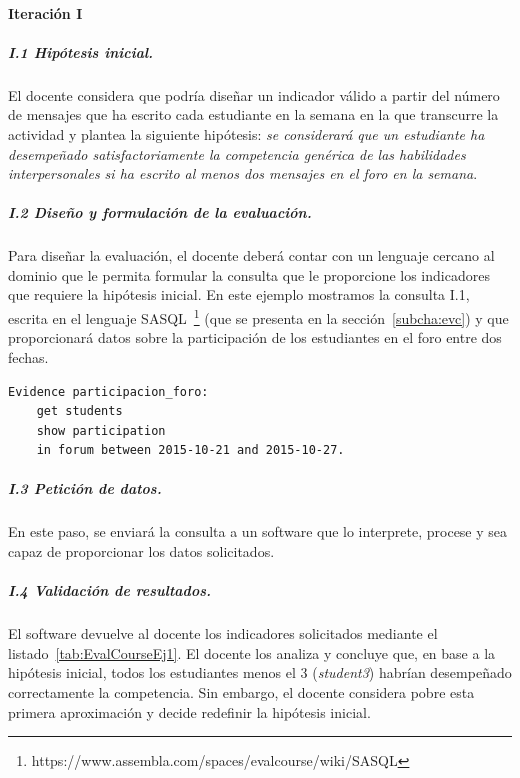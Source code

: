 \paragraph*{Iteración I}

\subparagraph*{I.1 Hipótesis inicial.}

El docente considera que podría diseñar un indicador válido a partir del número de mensajes que ha escrito cada estudiante en la semana en la que transcurre la actividad y plantea la siguiente hipótesis: \emph{se considerará que un estudiante ha desempeñado satisfactoriamente la competencia genérica de las habilidades interpersonales si ha escrito al menos dos mensajes en el foro en la semana}.

\subparagraph*{I.2 Diseño y formulación de la evaluación.}

Para diseñar la evaluación, el docente deberá contar con un lenguaje cercano al dominio que le permita formular la consulta que le proporcione los indicadores que requiere la hipótesis inicial. En este ejemplo mostramos la consulta I.1, escrita en el lenguaje SASQL~\footnote{https://www.assembla.com/spaces/evalcourse/wiki/SASQL} (que se presenta en la sección~\ref{subcha:evc}) y que proporcionará datos sobre la participación de los estudiantes en el foro entre dos fechas.

\begin{verbatim}
Evidence participacion_foro: 
	get students
	show participation
	in forum between 2015-10-21 and 2015-10-27.
\end{verbatim}


\subparagraph*{I.3 Petición de datos.}

En este paso, se enviará la consulta a un software que lo interprete, procese y sea capaz de proporcionar los datos solicitados. %

\subparagraph*{I.4 Validación de resultados.}

El software devuelve al docente los indicadores solicitados mediante el listado~\ref{tab:EvalCourseEj1}. El docente los analiza y concluye que, en base a la hipótesis inicial, todos los estudiantes menos el 3 (\emph{student3}) habrían desempeñado correctamente la competencia. Sin embargo, el docente considera pobre esta primera aproximación y decide redefinir la hipótesis inicial.


